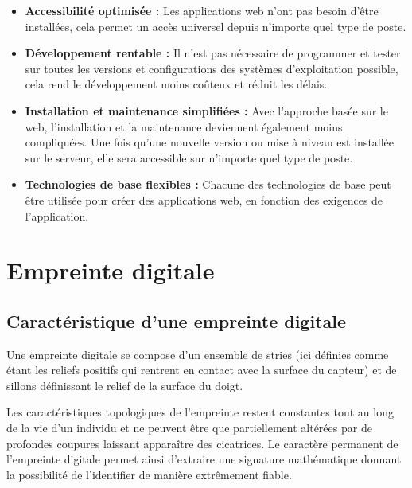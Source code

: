         \begin{itemize}

            \item[\textbullet] \textbf{Accessibilité optimisée :}
                Les applications web n’ont pas besoin d’être installées, cela permet un accès universel depuis n’importe quel type de poste.
            
            \item[\textbullet] \textbf{Développement rentable :}
                Il n'est pas nécessaire de programmer et tester sur toutes les versions et configurations des systèmes d'exploitation possible, cela rend le développement moins coûteux et réduit les délais.
            
             \item[\textbullet] \textbf{Installation et maintenance simplifiées :}
                Avec l'approche basée sur le web, l'installation et la maintenance deviennent également moins compliquées. Une fois qu'une nouvelle version ou mise à niveau est installée sur le serveur, elle sera accessible sur n'importe quel type de poste.
            
            \item[\textbullet] \textbf{Technologies de base flexibles :}
                Chacune des technologies de base peut être utilisée pour créer des applications web, en fonction des exigences de l'application.\cite{2}
            
        
        \end{itemize}
        
   
\section{Empreinte digitale}
        \subsection{Caractéristique d’une empreinte digitale}
            Une empreinte digitale se compose d’un ensemble de stries (ici définies comme étant les reliefs positifs qui rentrent en contact avec la surface du capteur) et de sillons définissant le relief de la surface du doigt. 
            
            Les caractéristiques topologiques de l’empreinte restent constantes tout au long de la vie d’un individu et ne peuvent être que partiellement altérées par de profondes coupures laissant apparaître des cicatrices. Le caractère permanent de l’empreinte digitale permet ainsi d’extraire une signature mathématique donnant la possibilité de l’identifier de manière extrêmement fiable.\cite{3}
        
